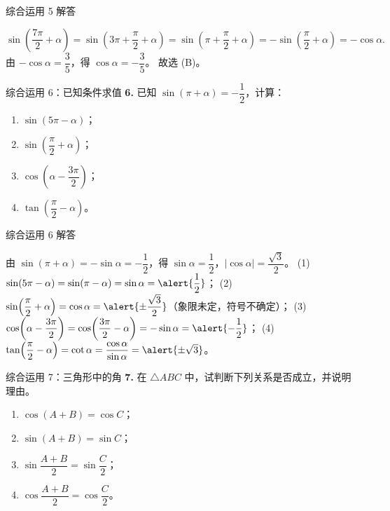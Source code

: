 \documentclass[10pt,aspectratio=169,serif]{beamer}
\begin{document}
\begin{frame}[t]{综合运用 5 解答}
\begin{tcolorbox}[colback=orange!10,colframe=orange,title=\textbf{解}]
\[
\sin\!\left(\frac{7\pi}{2}+\alpha\right)
=\sin\!\left(3\pi+\frac{\pi}{2}+\alpha\right)
=\sin\!\left(\pi+\frac{\pi}{2}+\alpha\right)
=-\sin\!\left(\frac{\pi}{2}+\alpha\right)
=-\cos\alpha.
\]
由 $-\cos\alpha=\dfrac35$，得 $\cos\alpha=-\dfrac35$。
\vspace{0.5em}
故选 \alert{(B)}。
\end{tcolorbox}
\end{frame}

\begin{frame}[t]{综合运用 6：已知条件求值}
\textbf{6.} 已知 $\sin(\pi+\alpha)=-\dfrac12$，计算：
\begin{enumerate}[(1)]
  \item $\sin(5\pi-\alpha)$； \qquad
  \item $\sin\!\left(\dfrac{\pi}{2}+\alpha\right)$； \qquad
  \item $\cos\!\left(\alpha-\dfrac{3\pi}{2}\right)$； \qquad
  \item $\tan\!\left(\dfrac{\pi}{2}-\alpha\right)$。
\end{enumerate}
\end{frame}

\begin{frame}[t]{综合运用 6 解答}
\begin{tcolorbox}[colback=orange!10,colframe=orange,title=\textbf{解}]
由 $\sin(\pi+\alpha)=-\sin\alpha=-\dfrac12$，得 $\sin\alpha=\dfrac12$，$|\cos\alpha|=\dfrac{\sqrt3}{2}$。
\vspace{0.3em}
(1) $\sin(5\pi-\alpha)=\sin(\pi-\alpha)=\sin\alpha=\alert{\dfrac12}$；
\vspace{0.3em}
(2) $\sin\!\left(\dfrac{\pi}{2}+\alpha\right)=\cos\alpha=\alert{\pm\dfrac{\sqrt3}{2}}$（象限未定，符号不确定）；
\vspace{0.3em}
(3) $\cos\!\left(\alpha-\dfrac{3\pi}{2}\right)=\cos\!\left(\dfrac{3\pi}{2}-\alpha\right)=-\sin\alpha=\alert{-\dfrac12}$；
\vspace{0.3em}
(4) $\tan\!\left(\dfrac{\pi}{2}-\alpha\right)=\cot\alpha=\dfrac{\cos\alpha}{\sin\alpha}=\alert{\pm\sqrt3}$。
\end{tcolorbox}
\end{frame}

\begin{frame}[t]{综合运用 7：三角形中的角}
\textbf{7.} 在 $\triangle ABC$ 中，试判断下列关系是否成立，并说明理由。
\begin{enumerate}[(1)]
  \item $\cos(A+B)=\cos C$； \qquad
  \item $\sin(A+B)=\sin C$；
  \item $\sin\dfrac{A+B}{2}=\sin\dfrac{C}{2}$； \qquad
  \item $\cos\dfrac{A+B}{2}=\cos\dfrac{C}{2}$。
\end{enumerate}
\end{frame}
\end{document}
